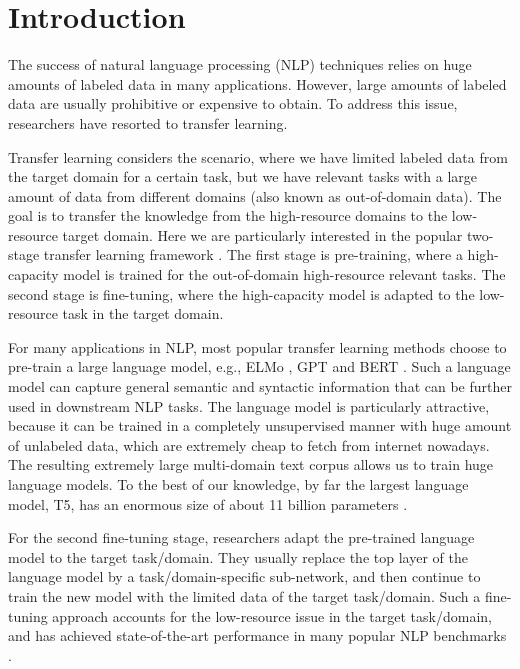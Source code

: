 \documentclass[11pt]{article} \usepackage{url}
\begin{document}
%
 

\section{Introduction}
\label{sec:intro}

The success of natural language processing (NLP) techniques relies on huge amounts of labeled data in many applications. However, large amounts of labeled data are usually prohibitive or expensive to obtain. To address this issue, researchers have resorted to transfer learning. 

Transfer learning considers the scenario, where we have limited labeled data from the target domain for a certain task, but we have relevant tasks with a large amount of data from different domains (also known as out-of-domain data). The goal is to transfer the knowledge from the high-resource domains to the low-resource target domain. Here we are particularly interested in the popular two-stage transfer learning framework \citep{pan2009survey}. The first stage is pre-training, where a high-capacity model is trained for the out-of-domain high-resource relevant tasks. The second stage is fine-tuning, where the high-capacity model is adapted to the low-resource task in the target domain.  

For many applications in NLP, most popular transfer learning methods choose to pre-train a large language model, e.g., ELMo \citep{peters2018deep}, GPT \citep{radford2019language} and BERT \citep{devlin2018bert}. Such a language model can capture general semantic and syntactic information that can be further used in downstream NLP tasks. 
The language model is particularly attractive, because it can be trained in a completely unsupervised manner with huge amount of unlabeled data, which are extremely cheap to fetch from internet nowadays. 
The resulting extremely large multi-domain text corpus allows us to train huge language models. To the best of our knowledge, by far the largest language model, T5, has an enormous size of about 11 billion parameters \citep{raffel2019t5}.



For the second fine-tuning stage, researchers adapt the pre-trained language model to the target task/domain. They usually replace the top layer of the language model by a task/domain-specific sub-network, and then continue to train the new model
with the limited data of the target task/domain. Such a fine-tuning approach accounts for the low-resource issue in the target task/domain, and has achieved state-of-the-art performance in many popular NLP benchmarks \citep{devlin2018bert,liu2019roberta,yang2019xlnet,lan2019albert,dong2019unified,raffel2019t5}. 
\end{document}
